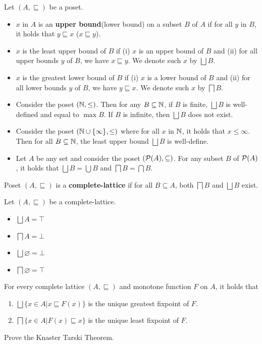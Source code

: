 \begin{definition}
    Let $(A,\sqsubseteq)$ be a poset.
    \begin{itemize}
        \item $x$ in $A$ is an \textbf{upper bound}(lower bound) on a subset $B$ of $A$ if for all $y$ in $B$, it holds that $y \sqsubseteq x$ ($x \sqsubseteq y$).
        \item $x$ is the least upper bound of $B$ if (i) $x$ is an upper bound of $B$ and (ii) for all upper bounds $y$ of $B$, we have $x \sqsubseteq y$. We denote such $x$ by $\bigsqcup B$.
        \item $x$ is the greatest lower bound of $B$ if (i) $x$ is a lower bound of $B$ and (ii) for all lower bounds $y$ of $B$, we have $y \sqsubseteq x$. We denote such $x$ by $\bigsqcap B$.
    \end{itemize}
\end{definition}
\begin{example} 
    \begin{itemize}
        \item Consider the poset $(\N,\leq)$. Then for any $B \subseteq \N$, if $B$ is finite, $\bigsqcup B$ is well-defined and equal to $\max B$. If $B$ is infinite, then $\bigsqcup B$ does not exist. 
        \item Consider the poset $(\N \cup \{\infty\},\leq)$ where for all $x$ in $\N$, it holds that $x \leq \infty$. Then for all $B \subseteq \N$, the least upper bound $\bigsqcup B$ is well-define. 
        \item Let $A$ be any set and consider the poset $(\P(A),\subseteq)$. For any subset $B$ of $\P(A)$, it holds that $\bigsqcup B = \bigcup B$ and $\bigsqcap B = \bigcap B$. 
    \end{itemize}
\end{example}
\begin{definition}
    Poset $(A,\sqsubseteq)$ is a \textbf{complete-lattice} if for all $B \subseteq A$, both $\bigsqcap B$ and $\bigsqcup B$ exist.
\end{definition}
\begin{example}
    Let $(A,\sqsubseteq)$ be a complete-lattice. 
    \begin{itemize}
        \item $\bigsqcup A = \top$
        \item $\bigsqcap A = \bot$
        \item $\bigsqcup \varnothing = \bot$
        \item $\bigsqcap \varnothing = \top$
    \end{itemize}
\end{example}
\begin{theorem}
    For every complete lattice $(A,\sqsubseteq)$ and monotone function $F$ on $A$, it holds that
    \begin{enumerate}
        \item $\bigsqcup \{x\in A| x \sqsubseteq F(x)\}$ is the unique greatest fixpoint of $F$. 
        \item $\bigsqcap \{x \in A| F(x) \sqsubseteq x\}$ is the unique least fixpoint of $F$. 
    \end{enumerate}
\end{theorem}


\begin{homework}
    Prove the Knaster Tarski Theorem.
\end{homework}

 